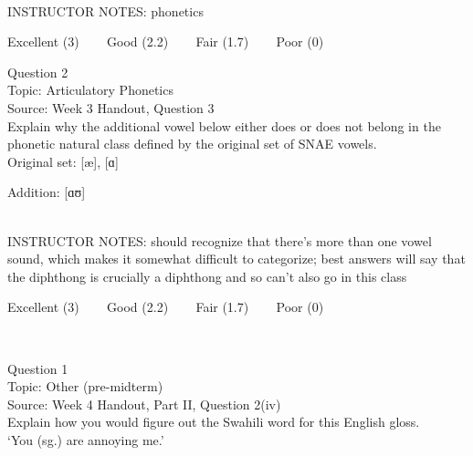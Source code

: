 \documentclass[12pt]{article}
\begin{document}
~\\
INSTRUCTOR NOTES: phonetics


\vfill
Excellent (3) ~~~ Good (2.2) ~~~ Fair (1.7) ~~~ Poor (0)
\newpage

{\large Question 2}\\

Topic: Articulatory Phonetics\\
Source: Week 3 Handout, Question 3\\

Explain why the additional vowel below either does or does not belong in the phonetic natural class defined by the original set of SNAE vowels.\\

Original set: {[æ]}, {[ɑ]}

Addition: {[ɑʊ]}


~\\
INSTRUCTOR NOTES: should recognize that there's more than one vowel sound, which makes it somewhat difficult to categorize; best answers will say that the diphthong is crucially a diphthong and so can't also go in this class


\vfill
Excellent (3) ~~~ Good (2.2) ~~~ Fair (1.7) ~~~ Poor (0)
\newpage

\begin{center}
\textbf{{\color{red}{\HUGE END OF EXAM}}}\\

\end{center}
\newpage

\begin{center}
\textbf{{\color{blue}{\HUGE START OF EXAM\\}}}

\textbf{{\color{blue}{\HUGE Student ID: 97077\\}}}

\textbf{{\color{blue}{\HUGE 9:50\\}}}

\end{center}
\newpage

{\large Question 1}\\

Topic: Other (pre-midterm)\\
Source: Week 4 Handout, Part II, Question 2(iv)\\

Explain how you would figure out the Swahili word for this English gloss.\\

‘You (sg.) are annoying me.’
\end{document}
